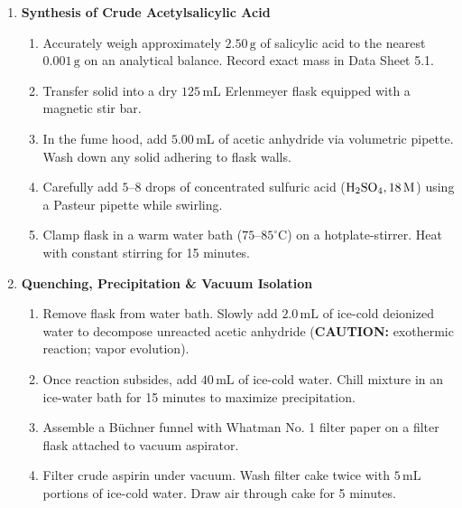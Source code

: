\documentclass[10pt,a4paper]{article}
\begin{document}
\begin{tcolorbox}[
  enhanced,
  colback=white,
  colframe=BorderGray,
  boxrule=0.5pt,
  arc=3pt,
  left=8pt, right=8pt, top=6pt, bottom=6pt
]
\small
\begin{enumerate}[label=\textbf{Part \Alph*:}, leftmargin=3em, itemsep=5pt, topsep=2pt]
  \item \textbf{Synthesis of Crude Acetylsalicylic Acid}
    \begin{enumerate}[label=\arabic*., leftmargin=1.5em, itemsep=2pt]
      \item Accurately weigh approximately $2.50\,\text{g}$ of salicylic acid to the nearest $0.001\,\text{g}$ on an analytical balance. Record exact mass in Data Sheet 5.1.
      \item Transfer solid into a dry $125\,\text{mL}$ Erlenmeyer flask equipped with a magnetic stir bar.
      \item In the fume hood, add $5.00\,\text{mL}$ of acetic anhydride via volumetric pipette. Wash down any solid adhering to flask walls.
      \item Carefully add $5\text{--}8$ drops of concentrated sulfuric acid ($\ce{H2SO4}, 18\,\text{M}$) using a Pasteur pipette while swirling.
      \item Clamp flask in a warm water bath ($75\text{--}85^\circ\text{C}$) on a hotplate-stirrer. Heat with constant stirring for 15 minutes.
    \end{enumerate}

  \item \textbf{Quenching, Precipitation \& Vacuum Isolation}
    \begin{enumerate}[label=\arabic*., leftmargin=1.5em, itemsep=2pt]
      \item Remove flask from water bath. Slowly add $2.0\,\text{mL}$ of ice-cold deionized water to decompose unreacted acetic anhydride (\textbf{CAUTION:} exothermic reaction; vapor evolution).
      \item Once reaction subsides, add $40\,\text{mL}$ of ice-cold water. Chill mixture in an ice-water bath for 15 minutes to maximize precipitation.
      \item Assemble a Büchner funnel with Whatman No. 1 filter paper on a filter flask attached to vacuum aspirator.
      \item Filter crude aspirin under vacuum. Wash filter cake twice with $5\,\text{mL}$ portions of ice-cold water. Draw air through cake for 5 minutes.
    \end{enumerate}


\end{enumerate}
\end{tcolorbox}
\end{document}
